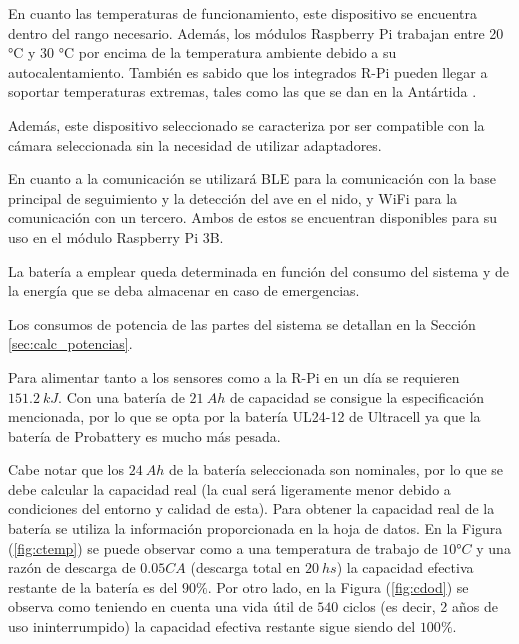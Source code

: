 En cuanto las temperaturas de funcionamiento, este dispositivo se encuentra dentro del rango necesario. Además, los módulos Raspberry Pi trabajan entre 20 °C y 30 °C por encima de la temperatura ambiente debido a su autocalentamiento. También es sabido que los integrados R-Pi pueden llegar a soportar temperaturas extremas, tales como las que se dan en la Antártida \cite{ref:Penguin}.

Además, este dispositivo seleccionado se caracteriza por ser compatible con la cámara seleccionada sin la necesidad de utilizar adaptadores.


En cuanto a la comunicación se utilizará BLE para la comunicación con la base principal de seguimiento y la detección del ave en el nido, y WiFi para la comunicación con un tercero.
Ambos de estos se encuentran disponibles para su uso en el módulo Raspberry Pi 3B.



La batería a emplear queda determinada en función del consumo del sistema y de la energía que se deba almacenar en caso de emergencias. 

Los consumos de potencia de las partes del sistema se detallan en la Sección \ref{sec:calc_potencias}.

Para alimentar tanto a los sensores como a la R-Pi en un día se requieren $151.2 \ kJ$. Con una batería de $21 \ Ah$ de capacidad se consigue la especificación mencionada, por lo que se opta por la batería UL24-12 de Ultracell ya que la batería de Probattery es mucho más pesada.

Cabe notar que los $24 \ Ah$ de la batería seleccionada son nominales, por lo que se debe calcular la capacidad real (la cual será ligeramente menor debido a condiciones del entorno y calidad de esta). Para obtener la capacidad real de la batería se utiliza la información proporcionada en la hoja de datos. En la Figura (\ref{fig:ctemp}) se puede observar como a una temperatura de trabajo de $10°C$ y una razón de descarga de $0.05CA$ (descarga total en $20 \ hs$) la capacidad efectiva restante de la batería es del $90\% $. Por otro lado, en la Figura (\ref{fig:cdod}) se observa como teniendo en cuenta una vida útil de $540$ ciclos (es decir, 2 años de uso ininterrumpido) la capacidad efectiva restante sigue siendo del $100\%$.
 
